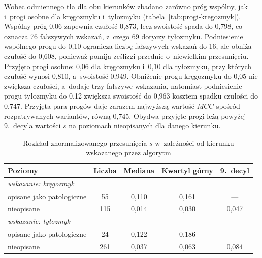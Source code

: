 Wobec odmiennego tła dla obu kierunków zbadano zarówno próg wspólny, jak i~progi osobne dla kręgozmyku i~tyłozmyku (tabela~\ref{tab:progi-kregozmyk}).
Wspólny próg 0,06 zapewnia czułość 0,873, lecz swoistość spada do 0,798, co oznacza 76 fałszywych wskazań, z~czego 69 dotyczy tyłozmyku.
Podniesienie wspólnego progu do 0,10 ogranicza liczbę fałszywych wskazań do 16, ale obniża czułość do 0,608, ponieważ pomija ześlizgi przednie o~niewielkim przesunięciu.
Przyjęto progi osobne: 0,06 dla kręgozmyku i~0,10 dla tyłozmyku, przy których czułość wynosi 0,810, a~swoistość 0,949.
Obniżenie progu kręgozmyku do 0,05 nie zwiększa czułości, a~dodaje trzy fałszywe wskazania, natomiast podniesienie progu tyłozmyku do 0,12 zwiększa swoistość do 0,963 kosztem spadku czułości do 0,747.
Przyjęta para progów daje zarazem najwyższą wartość $MCC$ spośród rozpatrywanych wariantów, równą 0,745.
Obydwa przyjęte progi leżą powyżej 9.~decyla wartości $s$ na poziomach nieopisanych dla danego kierunku.

\begin{table}[H]
    \centering
    \captionsetup{justification=centering, font=small}
    \caption{Rozkład znormalizowanego przesunięcia $s$ w~zależności od kierunku wskazanego przez algorytm}
    \label{tab:rozklad-kregozmyk}
    \small
    \begin{tabular}{lcccc}
        \hline
        \textbf{Poziomy} & \textbf{Liczba} & \textbf{Mediana} & \textbf{Kwartyl górny} & \textbf{9.~decyl} \\
        \hline
        \multicolumn{5}{l}{\textit{wskazanie: kręgozmyk}} \\
        opisane jako patologiczne & 55  & 0,110 & 0,161 & --- \\
        nieopisane                & 115 & 0,014 & 0,030 & 0,047 \\
        \hline
        \multicolumn{5}{l}{\textit{wskazanie: tyłozmyk}} \\
        opisane jako patologiczne & 24  & 0,122 & 0,186 & --- \\
        nieopisane                & 261 & 0,037 & 0,063 & 0,084 \\
        \hline
    \end{tabular}
\end{table}

